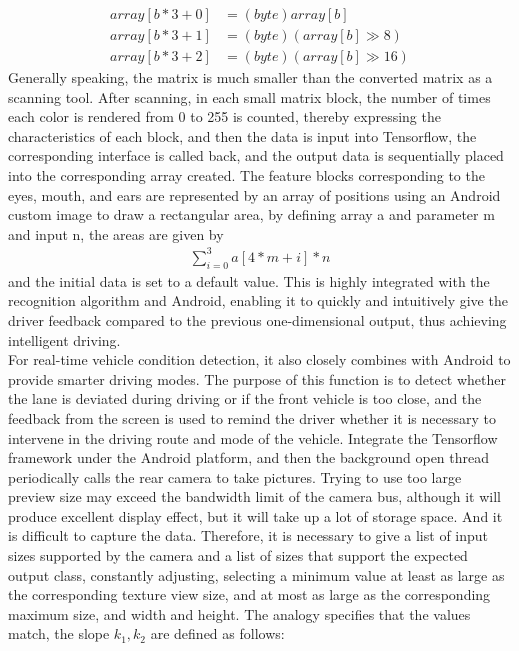 \documentclass[12pt, a4paper]{article}
\begin{document}
\begin{align}
  array[b \ast 3 + 0] &= (byte)array[b]\\
  array[b \ast 3 + 1] &= (byte)(array\left[b\right] \gg 8)\\
  array[b \ast 3 + 2] &= (byte)(array[b] \gg 16)
\end{align} 
Generally speaking, the matrix is ​​much smaller than the converted matrix as a scanning tool. After scanning, in each small matrix block, the number of times each color is rendered from 0 to 255 is counted, thereby expressing the characteristics of each block, and then the data is input into Tensorflow, the corresponding interface is called back, and the output data is sequentially placed into the corresponding array created. The feature blocks corresponding to the eyes, mouth, and ears are represented by an array of positions using an Android custom image to draw a rectangular area, by defining array a and parameter m and input n, the areas are given by
\begin{align}
  \sum_{i=0}^{3}a[4 \ast m + i] \ast n
\end{align}
and the initial data is set to a default value. This is highly integrated with the recognition algorithm and Android, enabling it to quickly and intuitively give the driver feedback compared to the previous one-dimensional output, thus achieving intelligent driving.
\\For real-time vehicle condition detection, it also closely combines with Android to provide smarter driving modes. The purpose of this function is to detect whether the lane is deviated during driving or if the front vehicle is too close, and the feedback from the screen is used to remind the driver whether it is necessary to intervene in the driving route and mode of the vehicle. Integrate the Tensorflow framework under the Android platform, and then the background open thread periodically calls the rear camera to take pictures. Trying to use too large preview size may exceed the bandwidth limit of the camera bus, although it will produce excellent display effect, but it will take up a lot of storage space. And it is difficult to capture the data. Therefore, it is necessary to give a list of input sizes supported by the camera and a list of sizes that support the expected output class, constantly adjusting, selecting a minimum value at least as large as the corresponding texture view size, and at most as large as the corresponding maximum size, and width and height. The analogy specifies that the values ​​match, the slope $k_1,k_2$ are defined as follows:
\end{document}
